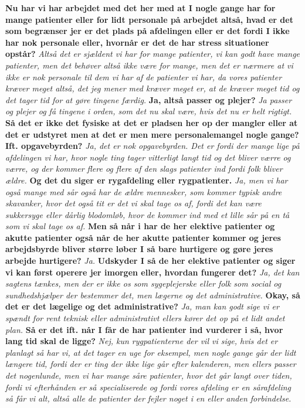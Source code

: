\textbf{Nu har vi har arbejdet med det her med at I nogle gange har for mange patienter eller for lidt personale på arbejdet altså, hvad er det som begrænser jer er det plads på afdelingen eller er det fordi I ikke har nok personale eller, hvornår er det de har stress situationer opstår?}
\textit{Altså det er sjældent vi har for mange patienter, vi kan godt have mange patienter, men det behøver altså ikke være for mange, men det er nærmere at vi ikke er nok personale til dem vi har af de patienter vi har, da vores patienter kræver meget altså, det jeg mener med kræver meget er, at de kræver meget tid og det tager tid for at gøre tingene færdig. } 
\textbf{Ja, altså passer og plejer?}
\textit{Ja passer og plejer og få tingene i orden, som det nu skal være, hvis det nu er helt rigtigt.}
\textbf{Så det er ikke det fysiske at det er pladsen her op der mangler eller at det er udstyret men at det er men mere personalemangel nogle gange? Ift. opgavebyrden?}
\textit{Ja, det er nok opgavebyrden. Det er fordi der mange lige på afdelingen vi har, hvor nogle ting tager vitterligt langt tid og det bliver værre og værre, og der kommer flere og flere af den slags patienter ind fordi folk bliver ældre.}
\textbf{Og det du siger er rygafdeling eller rygpatienter.}
\textit{ Ja, men vi har også mange med sår også har de ældre mennesker, som kommer typisk andre skavanker, hvor det også tit er det vi skal tage os af, fordi det kan være sukkersyge eller dårlig blodomløb, hvor de kommer ind med et lille sår på en tå som vi skal tage os af.}
\textbf{Men så når i har de her elektive patienter og akutte patienter også når de her akutte patienter kommer og jeres arbejdsbyrde bliver større løber I så bare hurtigere og gøre jeres arbejde hurtigere?}
\textit{Ja.}
\textbf{Udskyder I så de her elektive patienter og siger vi kan først operere jer imorgen eller, hvordan fungerer det?}
\textit{Ja, det kan sagtens tænkes, men der er ikke os som sygeplejerske eller folk som social og sundhedshjælper der bestemmer det, men lægerne og det administrative.}
\textbf{Okay, så det er det lægelige og det administrative?}
\textit{Ja, man kan godt sige vi er spændt for rent teknisk eller administrativt ellers kører det op på et lidt andet plan.}
\textbf{Så er det ift. når I får de har patienter ind vurderer i så, hvor lang tid skal de ligge?}
\textit{Nej,  kun rygpatienterne der vil vi sige, hvis det er planlagt så har vi,  at det tager en uge for eksempel, men nogle gange går der lidt længere tid, fordi der er ting der ikke lige går efter kalenderen, men ellers passer det nogenlunde, men vi har mange såre patienter, hvor det går langt over tiden, fordi vi efterhånden er så specialiserede og fordi vores afdeling er en sårafdeling så får vi alt, altså alle de patienter der fejler noget i en eller anden  forbindelse.}
